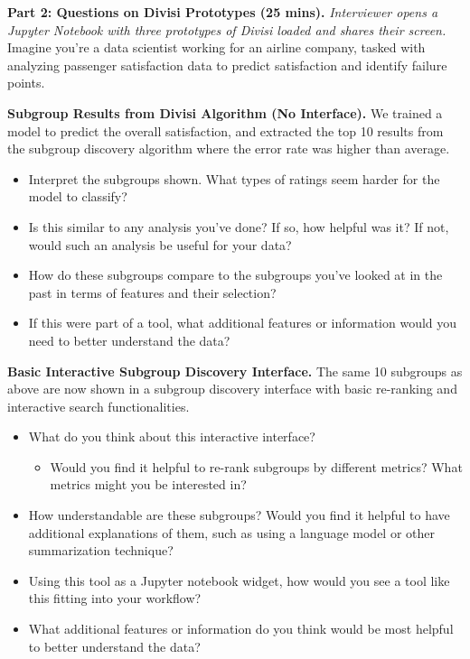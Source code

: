 \noindent \textbf{Part 2: Questions on Divisi Prototypes (25 mins).}
\textit{Interviewer opens a Jupyter Notebook with three prototypes of Divisi loaded and shares their screen.}
Imagine you’re a data scientist working for an airline company, tasked with analyzing passenger satisfaction data to predict satisfaction and identify failure points.

\textbf{Subgroup Results from Divisi Algorithm (No Interface).}
We trained a model to predict the overall satisfaction, and extracted the top 10 results from the subgroup discovery algorithm where the error rate was higher than average.
\begin{itemize}
    \item Interpret the subgroups shown. What types of ratings seem harder for the model to classify?
    \item Is this similar to any analysis you’ve done? If so, how helpful was it? If not, would such an analysis be useful for your data?
    \item How do these subgroups compare to the subgroups you’ve looked at in the past in terms of features and their selection?
    \item If this were part of a tool, what additional features or information would you need to better understand the data?
\end{itemize}

\textbf{Basic Interactive Subgroup Discovery Interface.}
The same 10 subgroups as above are now shown in a subgroup discovery interface with basic re-ranking and interactive search functionalities.
\begin{itemize}
    \item What do you think about this interactive interface?
    \begin{itemize}
        \item Would you find it helpful to re-rank subgroups by different metrics? What metrics might you be interested in?
    \end{itemize}
    \item How understandable are these subgroups? Would you find it helpful to have additional explanations of them, such as using a language model or other summarization technique?
    \item Using this tool as a Jupyter notebook widget, how would you see a tool like this fitting into your workflow?
    \item What additional features or information do you think would be most helpful to better understand the data?
\end{itemize}

